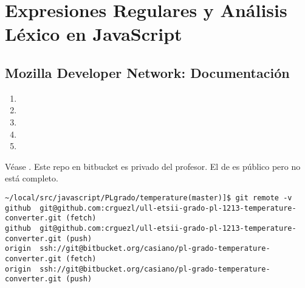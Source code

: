 \chapter{Expresiones Regulares y Análisis Léxico en JavaScript}
\label{chapter:expresionesregularesyanalisslexico}

\section{Mozilla Developer Network: Documentación}

\begin{enumerate}
\item {}
\item 
{}
\item 
{}
\item 
{}
\item 
{}
\end{enumerate}

\label{sectionpractica:conversordetemperaturas}

\label{parrafo:dondetemperatura}
Véase 
.
Este repo en bitbucket es privado del profesor.
El de 
es público pero no está completo.
\begin{verbatim}
~/local/src/javascript/PLgrado/temperature(master)]$ git remote -v
github  git@github.com:crguezl/ull-etsii-grado-pl-1213-temperature-converter.git (fetch)
github  git@github.com:crguezl/ull-etsii-grado-pl-1213-temperature-converter.git (push)
origin  ssh://git@bitbucket.org/casiano/pl-grado-temperature-converter.git (fetch)
origin  ssh://git@bitbucket.org/casiano/pl-grado-temperature-converter.git (push)
\end{verbatim}

